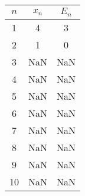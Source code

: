\documentclass[11pt]{article}
\begin{document}
\begin{exercise}{4}
{\begin{center}
\begin{tabular}{|c|c|c|}
                \hline
                $n$ & $x_n$ &  $E_n$ \\ \hline
                1   &  4    & 3      \\ \hline
                2   &  1    & 0      \\ \hline
                3   &  NaN  & NaN    \\ \hline
                4   &  NaN  & NaN    \\ \hline
                5   &  NaN  & NaN    \\ \hline
                6   &  NaN  & NaN    \\ \hline
                7   &  NaN  & NaN    \\ \hline
                8   &  NaN  & NaN    \\ \hline
                9   &  NaN  & NaN    \\ \hline
                10  &  NaN  & NaN    \\ \hline
            \end{tabular}
        \end{center}
    }
\end{exercise}

\end{document}
